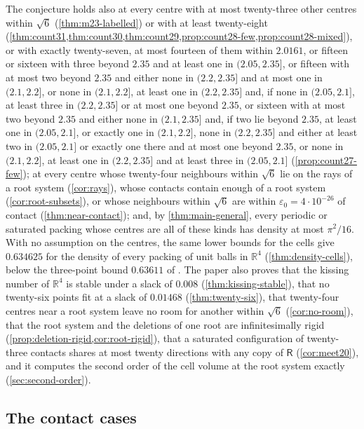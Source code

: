 \documentclass[11pt,reqno]{amsart}
\renewcommand{\_}{\origunderscore\allowbreak}
\numberwithin{equation}{section}
\theoremstyle{plain}
\theoremstyle{definition}
\theoremstyle{remark}
\newcommand{\Rt}{\mathsf{R}}                 %
\begin{document}
The conjecture holds also at every centre with at most twenty-three other
centres within $\sqrt6$ (\cref{thm:m23-labelled}) or with at least
twenty-eight
(\cref{thm:count31,thm:count30,thm:count29,prop:count28-few,prop:count28-mixed}),
or with exactly twenty-seven, at most fourteen of them within $2.0161$, or
fifteen or sixteen with three beyond $2.35$ and at least one in
$(2.05,2.35]$, or fifteen with at most two beyond $2.35$ and either none in
$(2.2,2.35]$ and at most one in $(2.1,2.2]$, or none in $(2.1,2.2]$, at least one in $(2.2,2.35]$ and, if none in $(2.05,2.1]$, at least three in $(2.2,2.35]$ or at most one beyond $2.35$, or sixteen with at most two beyond $2.35$
and either none in $(2.1,2.35]$ and, if two lie beyond $2.35$, at least one in $(2.05,2.1]$, or exactly one in $(2.1,2.2]$, none in $(2.2,2.35]$ and either at least two in $(2.05,2.1]$ or exactly one there and at most one beyond $2.35$, or none in $(2.1,2.2]$, at least one in $(2.2,2.35]$ and at least three in $(2.05,2.1]$ (\cref{prop:count27-few});
at every centre whose
twenty-four neighbours within
$\sqrt6$ lie on the rays of a root system (\cref{cor:rays}), whose contacts
contain enough of a root system (\cref{cor:root-subsets}), or whose
neighbours within $\sqrt6$ are within $\varepsilon_0=4\cdot10^{-26}$ of
contact (\cref{thm:near-contact}); and, by \cref{thm:main-general}, every
periodic or saturated packing whose centres are all of these kinds has
density at most $\pi^2/16$. With no assumption on the centres, the same
lower bounds for the cells give $0.634625$ for the density of every packing
of unit balls in $\mathbb{R}^4$ (\cref{thm:density-cells}), below the
three-point bound $0.63611$ of \cite{CdLS22}. The paper also proves that the kissing
number of $\mathbb{R}^4$ is stable under a slack of $0.008$
(\cref{thm:kissing-stable}), that no twenty-six points fit at a slack of
$0.01468$ (\cref{thm:twenty-six}), that twenty-four centres near a root system
leave no room for another within $\sqrt6$ (\cref{cor:no-room}), that the
root system and the deletions of one root are infinitesimally rigid
(\cref{prop:deletion-rigid,cor:root-rigid}), that a saturated configuration
of twenty-three contacts shares at most twenty directions with any copy of
$\Rt$ (\cref{cor:meet20}), and it computes the second order of the cell
volume at the root system exactly (\cref{sec:second-order}).

\subsection{The contact cases}
\end{document}
